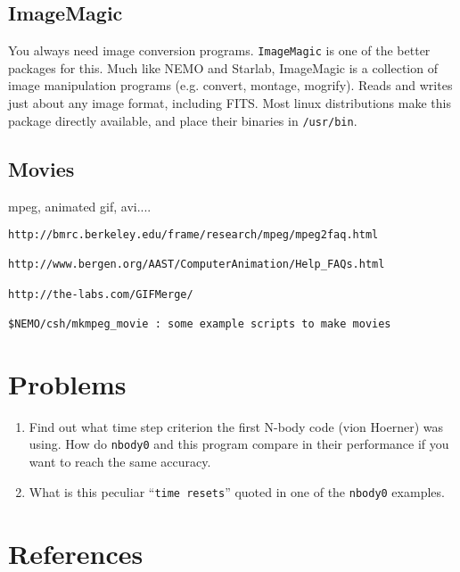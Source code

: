 
\section{ImageMagic}

You always need image conversion programs. {\tt ImageMagic} is one of 
the better packages for this. Much like NEMO and Starlab, ImageMagic
is a collection of image manipulation programs (e.g. convert, montage, mogrify).
Reads and writes just about any image format, including FITS. Most linux
distributions make this package directly available, and place their
binaries in {\tt /usr/bin}.

\section{Movies}

mpeg, animated gif, avi....

\begin{verbatim}
http://bmrc.berkeley.edu/frame/research/mpeg/mpeg2faq.html

http://www.bergen.org/AAST/ComputerAnimation/Help_FAQs.html

http://the-labs.com/GIFMerge/

$NEMO/csh/mkmpeg_movie : some example scripts to make movies

\end{verbatim} 
\chapter                {Problems}

\begin{enumerate}

\item 
Find out what time step criterion the first N-body code (vion Hoerner)
was using. How do {\tt nbody0} and this program compare in their performance
if you want to reach the same accuracy.

\item
What is this peculiar ``{\tt time resets}'' quoted in one of the {\tt nbody0}
examples.

\end{enumerate}


\chapter                {References}


